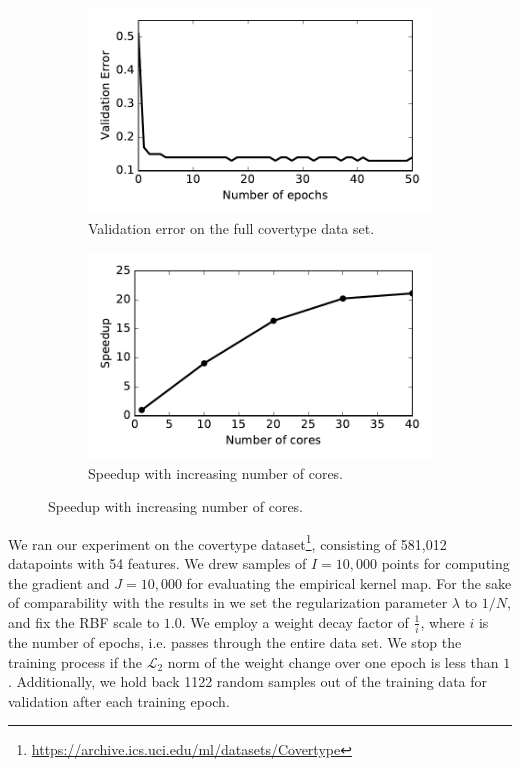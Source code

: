 \documentclass{article} %
\begin{document}
\begin{figure}[!ht]
	\begin{subfigure}[b]{0.45\textwidth}
		\centering
		\includegraphics[width=\textwidth]{imgs/covertype_validation.pdf}
		\caption{\centering Validation error on the full covertype data set.}
		\label{fig:covertype_validation}
	\end{subfigure}
  \hfill
	\begin{subfigure}[b]{0.45\textwidth}
		\centering
		\includegraphics[width=\textwidth]{imgs/speedup_58.pdf}
		\caption{\centering Speedup with increasing number of cores.}
		\label{fig:speedup_58}
	\end{subfigure}
\end{figure}

We ran our experiment on the covertype dataset\footnote{\url{https://archive.ics.uci.edu/ml/datasets/Covertype}}, consisting of 581,012 datapoints with 54 features. We drew samples of $I=10,000$ points for computing the gradient and $J=10,000$ for evaluating the empirical kernel map. For the sake of comparability with the results in \cite{Dai2014} we set the regularization parameter $\lambda$ to $1 / N$, and fix the RBF scale to $1.0$. We employ a weight decay factor of $\frac{1}{i}$, where $i$ is the number of epochs, i.e. passes through the entire data set. We stop the training process if the $\mathcal{L}_{2}$ norm of the weight change over one epoch is less than $1$. Additionally, we hold back 1122 random samples out of the training data for validation after each training epoch.
\end{document}
